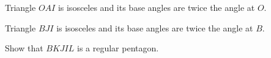 \begin{conjecture}\label{conj:pentagon-1}
Triangle $OAI$ is isosceles and its base angles are twice the angle at $O$.
\end{conjecture}

\begin{conjecture}\label{conj:pentagon-2}
Triangle $BJI$ is isosceles and its base angles are twice the angle at $B$.
\end{conjecture}

\begin{conjecture}\label{conj:pentagon-3}
Show that $BKJIL$ is a regular pentagon.
\end{conjecture}





\backmatter

\begin{annotation}

\end{annotation}


